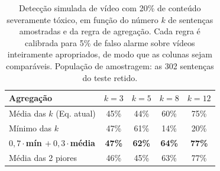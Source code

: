 \begin{table}[!t]
\centering
\caption{Detecção simulada de vídeo com 20\% de conteúdo severamente tóxico, em função do número $k$ de sentenças amostradas e da regra de agregação. Cada regra é calibrada para 5\% de falso alarme sobre vídeos inteiramente apropriados, de modo que as colunas sejam comparáveis. População de amostragem: as 302 sentenças do teste retido.}
\label{tab:simulacao}
\begin{tabular}{lcccc}
\hline
Agregação & $k=3$ & $k=5$ & $k=8$ & $k=12$ \\
\hline
Média das $k$ (Eq. atual) & 45\% & 44\% & 60\% & 75\% \\
Mínimo das $k$ & 47\% & 61\% & 14\% & 20\% \\
\textbf{$0{,}7\cdot$mín $+\ 0{,}3\cdot$média} & \textbf{47\%} & \textbf{62\%} & \textbf{64\%} & \textbf{77\%} \\
Média das 2 piores & 46\% & 45\% & 63\% & 77\% \\
\hline
\end{tabular}
\end{table}
